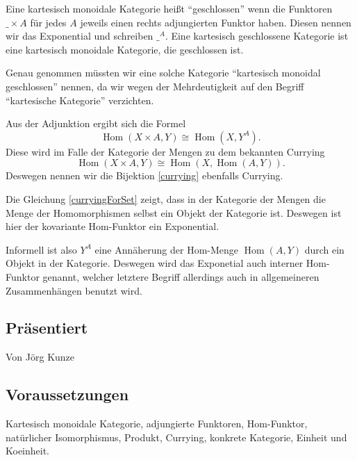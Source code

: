 \documentclass[a4paper]{amsart}
\theoremstyle{definition}
\DeclareMathOperator{\Hom}{Hom}
\begin{document}
Eine kartesisch monoidale Kategorie heißt "`geschlossen"' wenn die Funktoren $\_ \times A$ für jedes $A$ jeweils einen rechts adjungierten Funktor haben. Diesen nennen wir das Exponential und schreiben $\_ ^A$. Eine kartesisch geschlossene Kategorie ist eine kartesisch monoidale Kategorie, die geschlossen ist.

Genau genommen müssten wir eine solche Kategorie "`kartesisch monoidal geschlossen"' nennen, da wir wegen der Mehrdeutigkeit auf den Begriff "`kartesische Kategorie"' verzichten.

Aus der Adjunktion ergibt sich die Formel
\begin{equation}\label{currying}
    \Hom(X \times A, Y ) \cong \Hom(X, Y^A). 
\end{equation}
Diese wird im Falle der Kategorie der Mengen zu dem bekannten Currying 
\begin{equation}\label{curryingForSet}
   \Hom(X \times A, Y ) \cong \Hom(X, \Hom( A, Y)). 
\end{equation}
Deswegen nennen wir die Bijektion \eqref{currying} ebenfalls Currying.

Die Gleichung \eqref{curryingForSet} zeigt, dass in der Kategorie der Mengen die Menge der Homomorphismen selbst ein Objekt der Kategorie ist. Deswegen ist hier der kovariante Hom-Funktor ein Exponential.

Informell ist also $Y^A$ eine Annäherung der Hom-Menge $\Hom (A, Y)$ durch ein Objekt in der Kategorie. Deswegen wird das Exponetial auch interner Hom-Funktor genannt, welcher letztere Begriff allerdings auch in allgemeineren Zusammenhängen benutzt wird.

\subsection*{Präsentiert}
Von Jörg Kunze

\subsection*{Voraussetzungen}
Kartesisch monoidale Kategorie, adjungierte Funktoren, Hom-Funktor, natürlicher Isomorphismus, Produkt, Currying, konkrete Kategorie, Einheit und Koeinheit.
\end{document}
